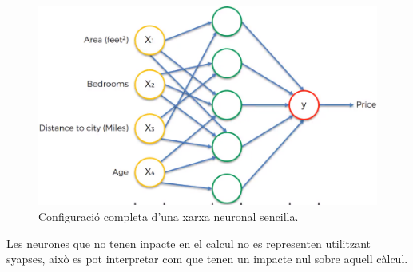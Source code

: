 \documentclass[12pt]{article}
\begin{document}
\pagebreak
\clearpage
\begin{figure}[h!]
	\centering
	\includegraphics[scale=0.3]{imatges/funcionament/2completa.png}
	\caption{Configuració completa d'una xarxa neuronal sencilla.}
\end{figure}
Les neurones que no tenen inpacte en el calcul no es representen utilitzant syapses, això es pot interpretar com que tenen un impacte nul sobre aquell càlcul.

\clearpage
\end{document}
